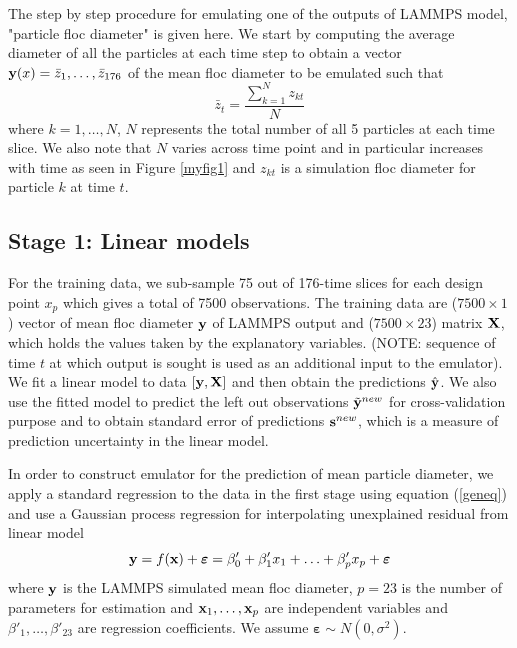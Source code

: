 \documentclass[12pt,titlepage]{report}
\newcommand{\bx}{{\bf x}}
\newcommand{\bX}{{\bf X}}
\newcommand{\by}{{\bf y}}
\newcommand{\tby}{{\tilde {\bf y}}}
\newcommand{\hby}{{\hat {\bf y}}}
\newcommand{\bs}{{\bf s}}
\theoremstyle{definition}
\theoremstyle{remark}
\begin{document}
The step by step procedure for emulating one of the outputs of LAMMPS model, "particle floc diameter" is given here. We start by computing the average diameter of all the particles at each time step to obtain a vector $\by(x)=\bar z_1,\ldots,\bar z_{176}$ of the mean floc diameter to be emulated such that
\begin{equation}
\bar z_t=\frac{\sum^N_{k=1} z_{kt}}{N}
\end{equation}
where $k=1,\ldots, N$, $N$ represents the total number of all 5 particles at each time slice. We also note that $N$ varies across time point and in particular increases with time as seen in Figure \ref{myfig1} and $z_{kt}$ is a simulation floc diameter for particle $k$ at time $t$.

\subsection{Stage 1: Linear models}
For the training data, we sub-sample 75 out of 176-time slices for each design point $x_p$ which gives a total of 7500 observations.
The training data are ($7500 \times 1$) vector of mean floc diameter $\by$ of LAMMPS output and ($7500 \times 23$) matrix $\bX$, which holds the values taken by the explanatory variables. (NOTE: sequence of time $t$ at which output is sought is used as an additional input to the emulator). We fit a linear model to data $[\by,\bX]$ and then obtain the predictions $\hby$.
We also use the fitted model to predict the left out observations $\tby^{new}$ for cross-validation purpose and to obtain standard error of predictions $\bs^{new}$, which is a measure of prediction uncertainty in the linear model. 

In order to construct emulator for the prediction of mean particle diameter, we apply a standard regression to the data in the first stage using equation (\ref{geneq}) and use a Gaussian process regression for interpolating unexplained residual from linear model
\begin{equation}\label{geneq}
\by=f(\textbf{\bx})+\boldsymbol\varepsilon= \beta'_0+\beta'_{1}x_{1}+\ldots +\beta'_{p}x_{p}+\boldsymbol\varepsilon
\end{equation}
where $\by$ is the LAMMPS simulated mean floc diameter, $p=23$ is the number of parameters for estimation and $\bx_1,\ldots,\bx_p$ are independent variables and $\beta'_1,\ldots,\beta'_{23}$ are regression coefficients. We assume $\boldsymbol \varepsilon \sim N(0, \sigma^2)$. 
\end{document}
